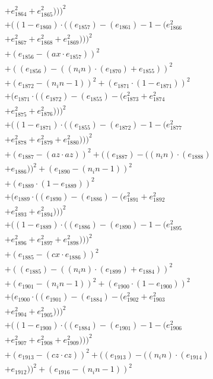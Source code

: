 \documentclass[10pt, a4paper]{article}
\begin{document}
\begin{align*}
& + e_{1864}^{2} + e_{1865}^{2})))^{2} \\
& + ((1 - e_{1860})  \cdot  ((e_{1857}) - (e_{1861}) - 1 - (e_{1866}^{2} \\
& + e_{1867}^{2} + e_{1868}^{2} + e_{1869}^{2})))^{2} \\
& + (e_{1856} - (ax  \cdot  e_{1857}))^{2} \\
& + ((e_{1856}) - ((n_in)  \cdot  (e_{1870}) + e_{1855}))^{2} \\
& + (e_{1872} - (n_in - 1))^{2} + (e_{1871}  \cdot  (1 - e_{1871}))^{2} \\
& + (e_{1871}  \cdot  ((e_{1872}) - (e_{1855}) - (e_{1873}^{2} + e_{1874}^{2} \\
& + e_{1875}^{2} + e_{1876}^{2})))^{2} \\
& + ((1 - e_{1871})  \cdot  ((e_{1855}) - (e_{1872}) - 1 - (e_{1877}^{2} \\
& + e_{1878}^{2} + e_{1879}^{2} + e_{1880}^{2})))^{2} \\
& + (e_{1887} - (az  \cdot  az))^{2} + ((e_{1887}) - ((n_in)  \cdot  (e_{1888}) \\
& + e_{1886}))^{2} + (e_{1890} - (n_in - 1))^{2} \\
& + (e_{1889}  \cdot  (1 - e_{1889}))^{2} \\
& + (e_{1889}  \cdot  ((e_{1890}) - (e_{1886}) - (e_{1891}^{2} + e_{1892}^{2} \\
& + e_{1893}^{2} + e_{1894}^{2})))^{2} \\
& + ((1 - e_{1889})  \cdot  ((e_{1886}) - (e_{1890}) - 1 - (e_{1895}^{2} \\
& + e_{1896}^{2} + e_{1897}^{2} + e_{1898}^{2})))^{2} \\
& + (e_{1885} - (cx  \cdot  e_{1886}))^{2} \\
& + ((e_{1885}) - ((n_in)  \cdot  (e_{1899}) + e_{1884}))^{2} \\
& + (e_{1901} - (n_in - 1))^{2} + (e_{1900}  \cdot  (1 - e_{1900}))^{2} \\
& + (e_{1900}  \cdot  ((e_{1901}) - (e_{1884}) - (e_{1902}^{2} + e_{1903}^{2} \\
& + e_{1904}^{2} + e_{1905}^{2})))^{2} \\
& + ((1 - e_{1900})  \cdot  ((e_{1884}) - (e_{1901}) - 1 - (e_{1906}^{2} \\
& + e_{1907}^{2} + e_{1908}^{2} + e_{1909}^{2})))^{2} \\
& + (e_{1913} - (cz  \cdot  cz))^{2} + ((e_{1913}) - ((n_in)  \cdot  (e_{1914}) \\
& + e_{1912}))^{2} + (e_{1916} - (n_in - 1))^{2} \\

\end{align*}
\end{document}

